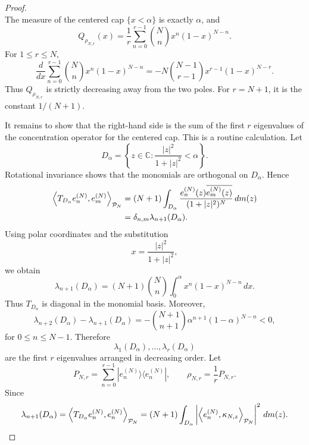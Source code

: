 \documentclass[12pt]{amsart}
\theoremstyle{plain}
\theoremstyle{definition}
\theoremstyle{remark}
\numberwithin{equation}{section}
\newcommand{\1}{\mathbf 1}
\begin{document}
\begin{proof}
\begin{equation}
\end{equation}%
The measure of the centered cap $\{x<\alpha \}$ is exactly $\alpha $, and 
\begin{equation}
Q_{\rho _{N,r}}(x)=\frac{1}{r}\sum_{n=0}^{r-1}\binom{N}{n}x^{n}(1-x)^{N-n}.
\label{eq:passivehusimi}
\end{equation}%
For $1\leq r\leq N$, 
\begin{equation}
\frac{d}{dx}\sum_{n=0}^{r-1}\binom{N}{n}x^{n}(1-x)^{N-n}=-N\binom{N-1}{r-1}%
x^{r-1}(1-x)^{N-r}.  \label{eq:binomialderivative}
\end{equation}%
Thus $Q_{\rho _{N,r}}$ is strictly decreasing away from the two poles. For $%
r=N+1$, it is the constant $1/(N+1)$.

It remains to show that the right-hand side is the sum of the first $r$
eigenvalues of the concentration operator for the centered cap. This is a
routine calculation. Let 
\begin{equation*}
D_{\alpha }=\left\{ z\in \mathbb{C}:\frac{|z|^{2}}{1+|z|^{2}}<\alpha
\right\} .
\end{equation*}%
Rotational invariance shows that the monomials are orthogonal on $D_{\alpha }
$. Hence 
\begin{align}
\left\langle T_{D_{\alpha }}e_{n}^{(N)},e_{m}^{(N)}\right\rangle _{\mathcal{P%
}_{N}}& =(N+1)\int_{D_{\alpha }}\frac{e_{n}^{(N)}(z)\overline{e_{m}^{(N)}(z)}%
}{(1+|z|^{2})^{N}}\,dm(z)  \notag \\
& =\delta _{n,m}\lambda _{n+1}(D_{\alpha }).  \label{eq:capdiagonal}
\end{align}%
Using polar coordinates and the substitution 
\begin{equation*}
x=\frac{|z|^{2}}{1+|z|^{2}},
\end{equation*}%
we obtain 
\begin{equation}
\lambda _{n+1}(D_{\alpha })=(N+1)\binom{N}{n}\int_{0}^{\alpha
}x^{n}(1-x)^{N-n}\,dx.  \label{eq:caplambda}
\end{equation}%
Thus $T_{D_{\alpha }}$ is diagonal in the monomial basis. Moreover, 
\begin{equation}
\lambda _{n+2}(D_{\alpha })-\lambda _{n+1}(D_{\alpha })=-\binom{N+1}{n+1}%
\alpha ^{n+1}(1-\alpha )^{N-n}<0,  \label{eq:capdecrease}
\end{equation}%
for $0\leq n\leq N-1$. Therefore 
\begin{equation*}
\lambda _{1}(D_{\alpha }),\ldots ,\lambda _{r}(D_{\alpha })
\end{equation*}%
are the first $r$ eigenvalues arranged in decreasing order. Let 
\begin{equation*}
P_{N,r}=\sum_{n=0}^{r-1}|e_{n}^{(N)}\rangle \langle e_{n}^{(N)}|,\qquad \rho
_{N,r}=\frac{1}{r}P_{N,r}.
\end{equation*}%
Since 
\begin{equation*}
\lambda _{n+1}(D_{\alpha })=\left\langle T_{D_{\alpha
}}e_{n}^{(N)},e_{n}^{(N)}\right\rangle _{\mathcal{P}_{N}}=(N+1)\int_{D_{%
\alpha }}\left\vert \left\langle e_{n}^{(N)},\kappa _{N,z}\right\rangle _{%
\mathcal{P}_{N}}\right\vert ^{2}\,dm(z)\text{.}
\end{equation*}


\end{proof}
\end{document}
